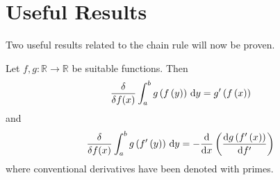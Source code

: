 \section{Useful Results}
Two useful results related to the chain rule will now be proven.
\begin{theorem}
  \label{theorem:chain_rules}
  Let $f,g\colon\mathbb{R}\rightarrow\mathbb{R}$ be suitable functions. Then
  \begin{equation}
    \label{eq:chain_rule_functionals}
    \fdv{f(x)} \int_a^b g\left(f\left(y\right)\right)\,\mathrm{d}y = g'\left(f\left(x\right)\right)
  \end{equation}
  and
  \begin{equation}
    \label{eq:chain_rule_derivatives_functional}
    \fdv{f(x)} \int_a^b g\left(f'\left(y\right)\right)\,\mathrm{d}y = -\dv{x}\left(\dv{g\left(f'\left(x\right)\right)}{f'}\right)
  \end{equation}
  where conventional derivatives have been denoted with primes.
\end{theorem}
